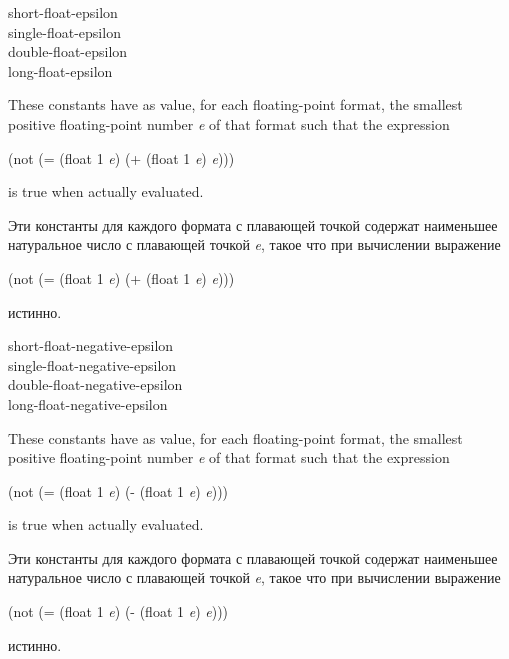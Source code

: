 \begin{defun}[Constant]
short-float-epsilon \\
single-float-epsilon \\
double-float-epsilon \\
long-float-epsilon

These constants have as value, for each floating-point format,
the smallest positive floating-point number \emph{e} of that format such that
the expression
\begin{lisp}
(not (= (float 1 \emph{e}) (+ (float 1 \emph{e}) \emph{e})))
\end{lisp}
is true when actually evaluated.

Эти константы для каждого формата с плавающей точкой содержат наименьшее
натуральное число с плавающей точкой \emph{e}, такое что при вычислении
выражение
\begin{lisp}
(not (= (float 1 \emph{e}) (+ (float 1 \emph{e}) \emph{e})))
\end{lisp}
истинно.
\end{defun}

\begin{defun}[Constant]
short-float-negative-epsilon \\
single-float-negative-epsilon \\
double-float-negative-epsilon \\
long-float-negative-epsilon

These constants have as value, for each floating-point format,
the smallest positive floating-point number \emph{e} of that format such that
the expression
\begin{lisp}
(not (= (float 1 \emph{e}) (- (float 1 \emph{e}) \emph{e})))
\end{lisp}
is true when actually evaluated.

Эти константы для каждого формата с плавающей точкой содержат наименьшее
натуральное число с плавающей точкой \emph{e}, такое что при вычислении выражение
\begin{lisp}
(not (= (float 1 \emph{e}) (- (float 1 \emph{e}) \emph{e})))
\end{lisp}
истинно.

\end{defun}

\endgroup
